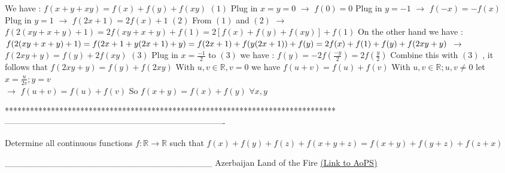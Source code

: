 \begin{solution}
We have : $f(x+y+xy) = f(x)+f(y)+f(xy)$ $(1)$
Plug in $x=y=0$ $\rightarrow$ $f(0) = 0$
Plug in $ y = -1$ $\rightarrow$ $f(-x) = -f(x)$
Plug in $ y = 1 $ $\rightarrow$ $f(2x+1) = 2f(x) + 1$ $(2)$
From $(1)$ and $(2)$ $\rightarrow$ $f(2(xy+x+y)+1) = 2f(xy+x+y) + f(1) = 2[f(x)+f(y)+f(xy)] +f(1)$
On the other hand we have : 
$f(2(xy+x+y)+1) = f(2x+1+y(2x+1) +y) \\ = f(2x+1) + f(y(2x+1)) + f(y) \\ =2f(x) + f(1) + f(y) + f(2xy + y)$
$\rightarrow$ $f(2xy + y) = f(y) + 2f(xy)$ $(3)$
Plug in $x = \frac{-1}{2} $ to $(3)$ we have :
$f(y) = -2f(\frac{-y}{2}) = 2f(\frac{y}{2})$ 
Combine this with $(3)$ , it follows that $f(2xy+y) = f(y) + f(2xy)$
With $u,v \in\mathbb{R} , v = 0$ we have $f(u+v) = f(u) + f(v)$
With $u,v \in\mathbb{R} ; u , v \ne 0$ let $x = \frac{u}{2v} ; y = v$ \\ $\rightarrow$ $f(u+v) = f(u) + f(v)$
So $f(x+y) = f(x) + f(y)$ $\forall x,y$
\end{solution}
*******************************************************************************
-------------------------------------------------------------------------------

\begin{problem}
	Determine all continuous functions $f: \mathbb{R}\to\mathbb{R}$ such that 
$f(x)+f(y)+f(z)+f(x+y+z)=f(x+y)+f(y+z)+f(z+x)$


_________________________________
Azerbaijan Land of the Fire 
	\flushright \href{https://artofproblemsolving.com/community/c6h489364}{(Link to AoPS)}
\end{problem}



